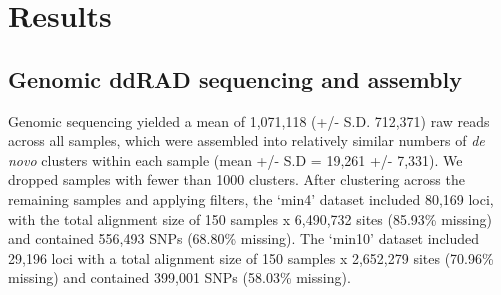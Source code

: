 \documentclass[11pt]{article}
\begin{document}



\section{Results}
\subsection{Genomic ddRAD sequencing and assembly}
Genomic sequencing yielded a mean of 1,071,118 (+/- S.D. 712,371) raw reads 
across all samples, which were assembled into relatively similar numbers of 
\emph{de novo} clusters within each sample (mean +/- S.D = 19,261 +/- 7,331). 
% 
We dropped samples with fewer than 1000 clusters. 
After clustering across the remaining samples and applying filters, 
the `min4' dataset included 80,169 loci, with the total alignment size of
150 samples x 6,490,732 sites (85.93\% missing) and contained 556,493 
SNPs (68.80\% missing). 
The `min10' dataset included 29,196 loci with a total alignment size of 
150 samples x 2,652,279 sites (70.96\% missing) and contained 399,001 SNPs
(58.03\% missing).
\end{document}
